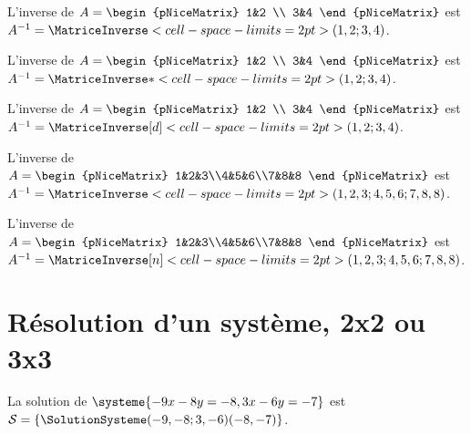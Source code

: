 \documentclass[french,a4paper,10pt]{article}
\begin{document}
\begin{demohigh}
L'inverse de $A=\begin{pNiceMatrix} 1&2 \\ 3&4 \end{pNiceMatrix}$ est
$A^{-1}=\MatriceInverse<cell-space-limits=2pt>(1,2;3,4)$.
\end{demohigh}

\begin{demohigh}
L'inverse de $A=\begin{pNiceMatrix} 1&2 \\ 3&4 \end{pNiceMatrix}$ est
$A^{-1}=\MatriceInverse*<cell-space-limits=2pt>(1,2;3,4)$.
\end{demohigh}

\begin{demohigh}
L'inverse de $A=\begin{pNiceMatrix} 1&2 \\ 3&4 \end{pNiceMatrix}$ est
$A^{-1}=\MatriceInverse[d]<cell-space-limits=2pt>(1,2;3,4)$.
\end{demohigh}

\begin{demohigh}
L'inverse de $A=\begin{pNiceMatrix} 1&2&3\\4&5&6\\7&8&8 \end{pNiceMatrix}$ est
$A^{-1}=\MatriceInverse<cell-space-limits=2pt>(1,2,3;4,5,6;7,8,8)$.
\end{demohigh}

\begin{demohigh}
L'inverse de $A=\begin{pNiceMatrix} 1&2&3\\4&5&6\\7&8&8 \end{pNiceMatrix}$ est
$A^{-1}=\MatriceInverse[n]<cell-space-limits=2pt>(1,2,3;4,5,6;7,8,8)$.
\end{demohigh}

\section*{Résolution d'un système, 2x2 ou 3x3}

\begin{demohigh}
La solution de $\systeme{-9x-8y=-8,3x-6y=-7}$ est $\mathcal{S}=%
\left\lbrace \SolutionSysteme(-9,-8;3,-6)(-8,-7) \right\rbrace$.
\end{demohigh}
\end{document}
